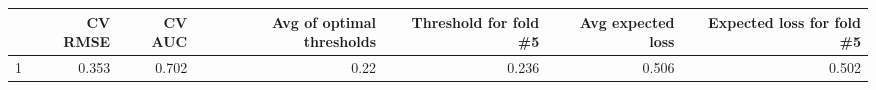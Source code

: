 
\begin{tabular}{lrrrrrr}
\toprule
  & CV RMSE & CV AUC & Avg of optimal thresholds & Threshold for fold \#5 & Avg expected loss & Expected loss for fold \#5\\
\midrule
1 & 0.353 & 0.702 & 0.22 & 0.236 & 0.506 & 0.502\\
\bottomrule
\end{tabular}